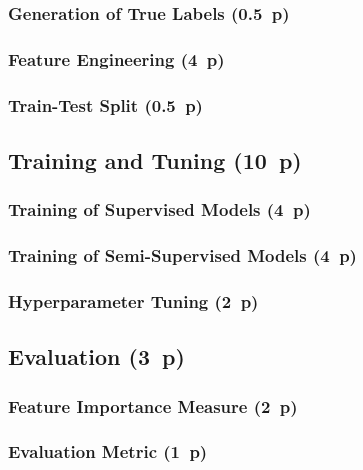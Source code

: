 \subsubsection{Generation of True
  Labels (0.5~p)}\label{generation-of-true-labels}

\subsubsection{Feature Engineering (4~p)}\label{feature-engineering}

\subsubsection{Train-Test Split (0.5~p)}\label{train-test-split}

\subsection{Training and Tuning (10~p)}\label{training-and-tuning}

\subsubsection{Training of Supervised
  Models (4~p)}\label{training-of-supervised-models}


\subsubsection{Training of Semi-Supervised
  Models (4~p)}\label{training-of-semi-supervised-models}


\subsubsection{Hyperparameter Tuning (2~p)}\label{hyperparameter-tuning}


\subsection{Evaluation (3~p)}\label{evaluation}

\subsubsection{Feature Importance
  Measure (2~p)}\label{feature-importance-measure}

\subsubsection{Evaluation Metric (1~p)}\label{evaluation-metric}

